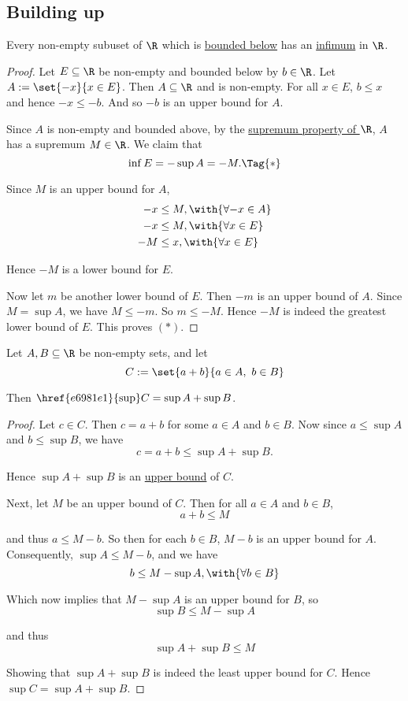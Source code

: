 \subsection{Building up}\label{f357ec2}

\label{ab2a2fe}

Every non-empty subuset of $\R$ which is \href{e4698be}{bounded below} has an
\href{ff16df6}{infimum} in $\R$.

\begin{proof}
  Let $E\subseteq\R$ be non-empty and bounded below by $b\in\R$. Let
  $A:=\set{-x}{x\in E}$. Then $A\subseteq\R$ and is non-empty. For all $x\in
  E$, $b\leq x$ and hence $-x\leq-b$. And so $-b$ is an upper bound for $A$.

  Since $A$ is non-empty and bounded above, by the \href{f330cf9}{supremum
  property of $\R$}, $A$ has a supremum $M\in\R$. We claim that
  \begin{equation*}
    \inf E=-\sup A=-M.\Tag{*}
  \end{equation*}

  Since $M$ is an upper bound for $A$,
  \begin{align*}
    -x &\leq M,\with{\forall{-x}\in A} \\
    -x &\leq M,\with{\forall{x}\in E}  \\
    -M &\leq x,\with{\forall{x}\in E}
  \end{align*}

  Hence $-M$ is a lower bound for $E$.

  Now let $m$ be another lower bound of $E$. Then $-m$ is an upper bound of
  $A$. Since $M=\sup A$, we have $M\leq-m$. So $m\leq-M$. Hence $-M$ is indeed
  the greatest lower bound of $E$. This proves $(*)$.
\end{proof}

\Result{}\label{f426fd0}

Let $A,B\subseteq\R$ be non-empty sets, and let
$$
  C:=\set{a+b}{a\in A,\ b\in B}
$$

Then $\href{e6981e1}{\sup}C=\sup A+\sup B$.

\begin{proof}
  Let $c\in C$. Then $c=a+b$ for some $a\in A$ and $b\in B$. Now since
  $a\leq\sup A$ and $b\leq\sup B$, we have
  $$
    c=a+b\leq\sup A+\sup B.
  $$

  Hence $\sup A+\sup B$ is an \href{e4698be}{upper bound} of $C$.

  Next, let $M$ be an upper bound of $C$. Then for all $a\in A$ and $b\in B$,
  $$
    a+b\leq M
  $$

  and thus $a\leq M-b$. So then for each $b\in B$, $M-b$ is an upper bound for
  $A$. Consequently, $\sup A\leq M-b$, and we have
  $$
    b\leq M-\sup A,\with{\forall b\in B}
  $$

  Which now implies that $M-\sup A$ is an upper bound for $B$, so
  $$
    \sup B\leq M-\sup A
  $$

  and thus
  $$
    \sup A+\sup B\leq M
  $$

  Showing that $\sup A+\sup B$ is indeed the least upper bound for $C$. Hence
  $\sup C=\sup A+\sup B$.
\end{proof}

